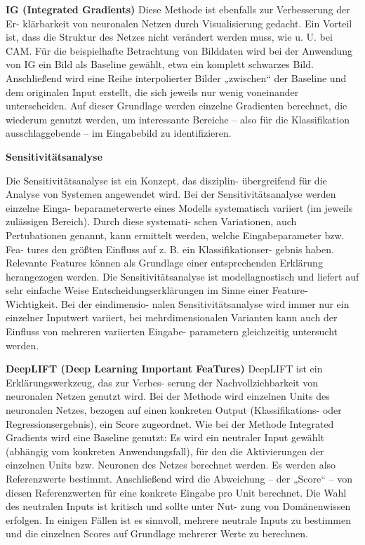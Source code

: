 \documentclass[11pt,a4paper]{article}
\numberwithin{equation}{section}
\begin{document}
	\noindent\textbf{IG (Integrated Gradients)}
	Diese Methode ist ebenfalls zur Verbesserung der Er-
	klärbarkeit von neuronalen Netzen durch Visualisierung
	gedacht. Ein Vorteil ist, dass die Struktur des Netzes
	nicht verändert werden muss, wie u. U. bei CAM. Für
	die beispielhafte Betrachtung von Bilddaten wird bei
	der Anwendung von IG ein Bild als Baseline gewählt,
	etwa ein komplett schwarzes Bild. Anschließend wird
	eine Reihe interpolierter Bilder „zwischen“ der Baseline
	und dem originalen Input erstellt, die sich jeweils nur
	wenig voneinander unterscheiden. Auf dieser Grundlage
	werden einzelne Gradienten berechnet, die wiederum
	genutzt werden, um interessante Bereiche – also für die
	Klassifikation ausschlaggebende – im Eingabebild zu
	identifizieren.
	
	\noindent\textbf{Sensitivitätsanalyse}
	
	Die Sensitivitätsanalyse ist ein Konzept, das disziplin-
	übergreifend für die Analyse von Systemen angewendet
	wird. Bei der Sensitivitätsanalyse werden einzelne Einga-
	beparameterwerte eines Modells systematisch variiert
	(im jeweils zulässigen Bereich). Durch diese systemati-
	schen Variationen, auch Pertubationen genannt, kann
	ermittelt werden, welche Eingabeparameter bzw. Fea-
	tures den größten Einfluss auf z. B. ein Klassifikationser-
	gebnis haben. Relevante Features können als Grundlage
	einer entsprechenden Erklärung herangezogen werden.
	Die Sensitivitätsanalyse ist modellagnostisch und liefert
	auf sehr einfache Weise Entscheidungserklärungen im
	Sinne einer Feature-Wichtigkeit. Bei der eindimensio-
	nalen Sensitivitätsanalyse wird immer nur ein einzelner
	Inputwert variiert, bei mehrdimensionalen Varianten
	kann auch der Einfluss von mehreren variierten Eingabe-
	parametern gleichzeitig untersucht werden.
	
	\noindent \textbf{DeepLIFT (Deep Learning Important
		FeaTures)}
	DeepLIFT ist ein Erklärungswerkzeug, das zur Verbes-
	serung der Nachvollziehbarkeit von neuronalen Netzen
	genutzt wird. Bei der Methode wird einzelnen Units des
	neuronalen Netzes, bezogen auf einen konkreten Output
	(Klassifikations- oder Regressionsergebnis), ein Score
	zugeordnet. Wie bei der Methode Integrated Gradients
	wird eine Baseline genutzt: Es wird ein neutraler Input
	gewählt (abhängig vom konkreten Anwendungsfall),
	für den die Aktivierungen der einzelnen Units bzw.
	Neuronen des Netzes berechnet werden. Es werden
	also Referenzwerte bestimmt. Anschließend wird die
	Abweichung – der „Score“ – von diesen Referenzwerten
	für eine konkrete Eingabe pro Unit berechnet. Die Wahl
	des neutralen Inputs ist kritisch und sollte unter Nut-
	zung von Domänenwissen erfolgen. In einigen Fällen ist es sinnvoll, mehrere neutrale Inputs zu bestimmen und
	die einzelnen Scores auf Grundlage mehrerer Werte zu
	berechnen.
	
\end{document}

